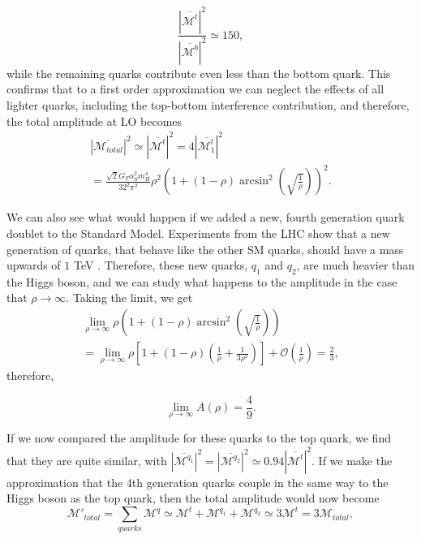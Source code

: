 \documentclass[EPJ,twocolumn]{webofc}
\begin{document}
\begin{equation}
    \frac{|\overline{\mathcal{M}^t}|^2}{|\overline{\mathcal{M}^b}|^2} \simeq 150,
\end{equation}
while the remaining quarks contribute even less than the bottom quark. This confirms that to a first order approximation we can neglect the effects of all lighter quarks, including the top-bottom interference contribution, and therefore, the total amplitude at LO becomes 
\begin{multline}
    |\overline{\mathcal{M}_{total}}|^2 \simeq |\overline{\mathcal{M}^t}|^2= 4|\overline{\mathcal{M}_1^t}|^2 \\ = \frac{\sqrt{2}G_F\alpha_S^2m_H^4}{32^2\pi^2}\rho^2\left( 1+(1-\rho)\arcsin^2{\left(\sqrt{\frac{1}{\rho}} \right)}\right)^2 .
\end{multline}

We can also see what would happen if we added a new, fourth generation quark doublet to the Standard Model. Experiments from the LHC show that a new generation of quarks, that behave like the other SM quarks, should have a mass upwards of $1$ TeV \cite{CMS:2019eqb}. Therefore, these new quarks, $q_1 $ and $q_2$, are much heavier than the Higgs boson, and we can study what happens to the amplitude in the case that $\rho \rightarrow \infty$. Taking the limit, we get
\begin{multline}
    \lim_{\rho\rightarrow\infty} \rho\left( 1+(1-\rho)\arcsin^2{\left(\sqrt{\frac{1}{\rho}} \right)}\right) \\  =  \lim_{\rho\rightarrow\infty} \rho\left[1+(1-\rho)\left(\frac{1}{\rho}+\frac{1}{3\rho^2}\right) \right] + \mathcal{O}\left(\frac{1}{\rho}\right) = \frac{2}{3},
\end{multline}
therefore,

\begin{equation}
    \lim_{\rho\rightarrow\infty} A\left(\rho\right) = \frac{4}{9}.
\end{equation}

If we now compared the amplitude for these quarks to the top quark, we find that they are quite similar, with $|\overline{\mathcal{M}^{q_1}}|^2 = |\overline{\mathcal{M}^{q_2}}|^2  \simeq 0.94|\overline{\mathcal{M}^t}|^2$. If we make the approximation that the 4th generation quarks couple in the same way to the Higgs boson as the top quark, then the total amplitude would now become 
\begin{equation}
    \mathcal{M}'_{total} =  \sum_{quarks} \mathcal{M}^q \simeq \mathcal{M}^t+\mathcal{M}^{q_1}+\mathcal{M}^{q_2}\simeq 3\mathcal{M}^t = 3\mathcal{M}_{total},
\end{equation}
\end{document}
